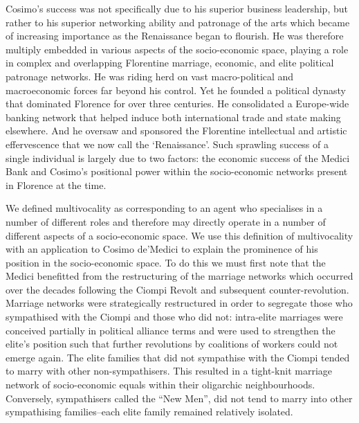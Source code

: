Cosimo's success was not specifically due to his superior business leadership, but rather to his superior networking ability and patronage of the arts which became of increasing importance as the Renaissance began to flourish. He was therefore multiply embedded in various aspects of the socio-economic space, playing a role in complex and overlapping Florentine marriage, economic, and elite political patronage networks. He was riding herd on vast macro-political and macroeconomic forces far beyond his control. Yet he founded a political dynasty that dominated Florence for over three centuries. He consolidated a Europe-wide banking network that helped induce both international trade and state making elsewhere. And he oversaw and sponsored the Florentine intellectual and artistic effervescence that we now call the `Renaissance'. Such sprawling success of a single individual is largely due to two factors: the economic success of the Medici Bank and Cosimo's positional power within the socio-economic networks present in Florence at the time.

We defined multivocality as corresponding to an agent who specialises in a number of different roles and therefore may directly operate in a number of different aspects of a socio-economic space. We use this definition of multivocality with an application to Cosimo de'Medici to explain the prominence of his position in the socio-economic space. To do this we must first note that the Medici benefitted from the restructuring of the marriage networks which occurred over the decades following the Ciompi Revolt and subsequent counter-revolution. Marriage networks were strategically restructured in order to segregate those who sympathised with the Ciompi and those who did not: intra-elite marriages were conceived partially in political alliance terms and were used to strengthen the elite's position such that further revolutions by coalitions of workers could not emerge again. The elite families that did not sympathise with the Ciompi tended to marry with other non-sympathisers. This resulted in a tight-knit marriage network of socio-economic equals within their oligarchic neighbourhoods. Conversely, sympathisers called the ``New Men'', did not tend to marry into other sympathising families--each elite family remained relatively isolated.

